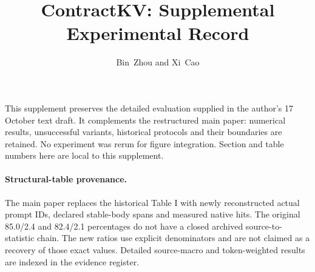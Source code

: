 \documentclass[journal]{IEEEtran}
\begin{document}
\title{ContractKV: Supplemental Experimental Record}
\author{Bin~Zhou and Xi~Cao}
\maketitle
\noindent This supplement preserves the detailed evaluation supplied in the author's 17 October text draft. It complements the restructured main paper: numerical results, unsuccessful variants, historical protocols and their boundaries are retained. No experiment was rerun for figure integration. Section and table numbers here are local to this supplement.

\paragraph{Structural-table provenance.} The main paper replaces the historical Table I with newly reconstructed actual prompt IDs, declared stable-body spans and measured native hits. The original 85.0/2.4 and 82.4/2.1 percentages do not have a closed archived source-to-statistic chain. The new ratios use explicit denominators and are not claimed as a recovery of those exact values. Detailed source-macro and token-weighted results are indexed in the evidence register.


\end{document}
